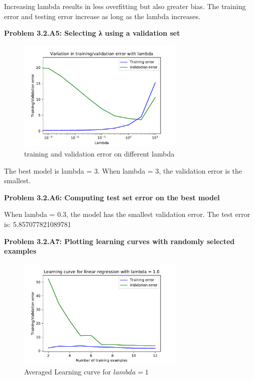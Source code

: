\documentclass[]{book}
\theoremstyle{definition}
\begin{document}
\begin{flushleft}
	Increasing lambda results in less overfitting but also greater bias. The training error and testing error increase as long as the lambda increases.
\end{flushleft}
\textbf{Problem 3.2.A5: Selecting λ using a validation set}
\begin{figure}[H]
	\centering
	\includegraphics[width=8cm]{fig10to11.pdf}
	\caption{training and validation error on different lambda}
	\label{fig:12}
\end{figure}
\begin{flushleft}
	The best model is lambda = 3. When lambda = 3, the validation error is the smallest. 
\end{flushleft}
\textbf{Problem 3.2.A6: Computing test set error on the best model}
\begin{flushleft}
	When lambda = 0.3, the model has the smallest validation error. The test error is: 5.857077821089781
\end{flushleft}
\textbf{Problem 3.2.A7: Plotting learning curves with randomly selected examples}
\begin{figure}[H]
	\centering
	\includegraphics[width=8cm]{fig11.pdf}
	\caption{Averaged Learning curve for $lambda = 1$}
	\label{fig:13}
\end{figure}
\end{document}

